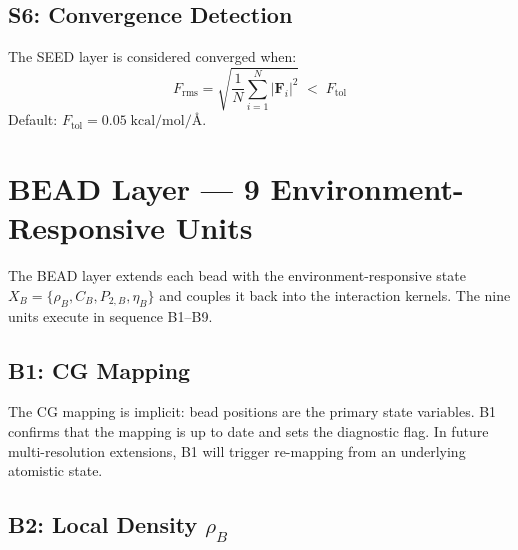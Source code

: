 \documentclass[11pt, a4paper, oneside]{article}
\newcommand{\Ang}{\text{\AA}}
\newcommand{\kcalmol}{\text{kcal/mol}}
\begin{document}
\subsection{S6: Convergence Detection}
\label{sec:s6-convergence}

The SEED layer is considered converged when:
%
\begin{equation}
  F_{\text{rms}} = \sqrt{\frac{1}{N} \sum_{i=1}^{N} |\mathbf{F}_i|^2}
  \;<\; F_{\text{tol}}
  \label{eq:seed-convergence}
\end{equation}
%
Default: $F_{\text{tol}} = 0.05\;\kcalmol/\Ang$.

\newpage
\section{BEAD Layer — 9 Environment-Responsive Units}
\label{sec:bead-layer}

The BEAD layer extends each bead with the environment-responsive state
$X_B = \{\rho_B, C_B, P_{2,B}, \eta_B\}$ and couples it back into the
interaction kernels.  The nine units execute in sequence B1--B9.

\subsection{B1: CG Mapping}
\label{sec:b1-mapping}

The CG mapping is implicit: bead positions are the primary state
variables.  B1 confirms that the mapping is up to date and sets the
diagnostic flag.  In future multi-resolution extensions, B1 will
trigger re-mapping from an underlying atomistic state.

\subsection{B2: Local Density \texorpdfstring{$\rho_B$}{rhoB}}
\label{sec:b2-density}
\end{document}

